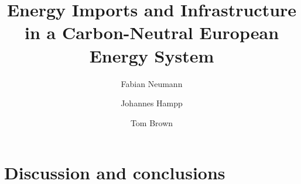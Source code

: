 \documentclass[5p,9pt]{elsarticle}
\begin{document}
\begin{frontmatter}

	\title{Energy Imports and Infrastructure in a Carbon-Neutral European Energy System}

	\author[tub]{Fabian Neumann}
	\author[pik]{Johannes Hampp}
	\author[tub]{Tom Brown}

	\address[tub]{Department of Digital Transformation in Energy Systems, Institute of Energy Technology,\\Technische Universität Berlin, Fakultät III, Einsteinufer 25 (TA 8), 10587 Berlin, Germany}
	\address[pik]{Potsdam Institute for Climate Impact Research (PIK), Member of the Leibniz Association, P.O.~Box 60 12 03, 14412 Potsdam, Germany}

	\begin{abstract}
		
	\end{abstract}




\end{frontmatter}









\section*{Discussion and conclusions}
\label{sec:discussion}
\end{document}
